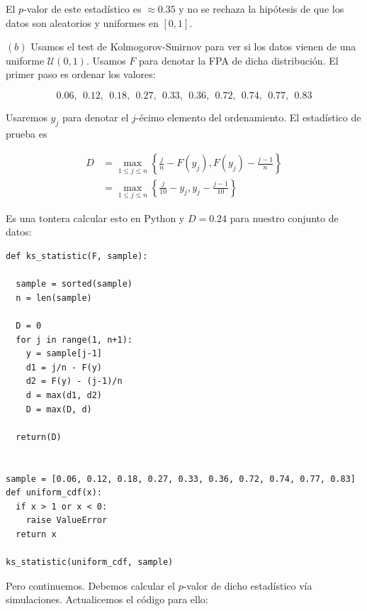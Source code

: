 \documentclass[a4paper, 12pt]{article}
\begin{document}
El $p$-valor de este estadístico es $\approx 0.35$ y no se rechaza la hipótesis
de que los datos son aleatorios y uniformes en $[0, 1]$.

$(b)$ Usamos el test de Kolmogorov-Smirnov para ver si los datos vienen de una
uniforme $\mathcal{U}(0, 1)$. Usamos $F$ para denotar la FPA de dicha
distribución.  El primer paso es ordenar los valores: 

\begin{equation*}
    0.06,~~0.12,~~0.18,~~0.27,~~0.33,~~0.36,~~0.72,~~0.74,~~0.77,~~0.83
\end{equation*}

Usaremos $y_j$ para denotar el $j$-écimo elemento del ordenamiento. El
estadístico de prueba es 

\begin{align*}
    D &= \max_{1 \leq j \leq n} \left\{ \frac{j}{n} - F(y_j), F(y_j) -
    \frac{j-1}{n} \right\}  \\ 
      &=\max_{1 \leq j \leq n}\left\{ \frac{j}{10} - y_j, y_j - \frac{j-1}{10} \right\} 
\end{align*}

Es una tontera calcular esto en Python y $D = 0.24$ para nuestro conjunto de
datos:

\begin{verbatim}
def ks_statistic(F, sample):

  sample = sorted(sample)
  n = len(sample)
  
  D = 0 
  for j in range(1, n+1):
    y = sample[j-1]
    d1 = j/n - F(y) 
    d2 = F(y) - (j-1)/n
    d = max(d1, d2)
    D = max(D, d)

  return(D)


sample = [0.06, 0.12, 0.18, 0.27, 0.33, 0.36, 0.72, 0.74, 0.77, 0.83]
def uniform_cdf(x):
  if x > 1 or x < 0:
    raise ValueError 
  return x

ks_statistic(uniform_cdf, sample)
\end{verbatim}

Pero continuemos. Debemos calcular el $p$-valor de dicho estadístico vía
simulaciones. Actualicemos el código para ello:
\end{document}
